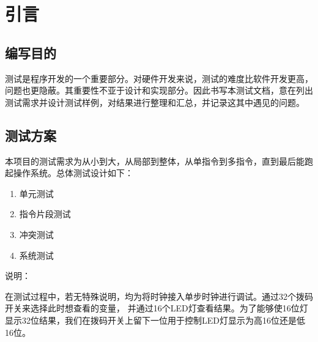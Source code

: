 \newpage
\section{引言}
\subsection{编写目的}

测试是程序开发的一个重要部分。对硬件开发来说，测试的难度比软件开发更高，问题也更隐蔽。其重要性不亚于设计和实现部分。因此书写本测试文档，意在列出测试需求并设计测试样例，对结果进行整理和汇总，并记录这其中遇见的问题。

\subsection{测试方案}

本项目的测试需求为从小到大，从局部到整体，从单指令到多指令，直到最后能跑起操作系统。总体测试设计如下：

\begin{enumerate}

\item 单元测试

\item 指令片段测试

\item 冲突测试

\item 系统测试

\end{enumerate}

说明：

在测试过程中，若无特殊说明，均为将时钟接入单步时钟进行调试。通过32个拨码开关来选择此时想查看的变量， 并通过16个LED灯查看结果。为了能够使16位灯显示32位结果，我们在拨码开关上留下一位用于控制LED灯显示为高16位还是低16位。
\newpage
